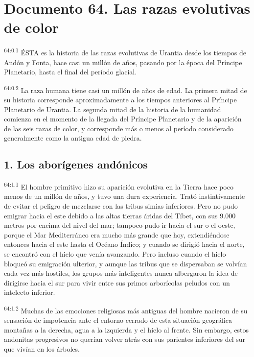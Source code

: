 \chapter{Documento 64. Las razas evolutivas de color}
\par
\textsuperscript{64:0.1} ÉSTA es la historia de las razas evolutivas de Urantia desde los tiempos de Andón y Fonta, hace casi un millón de años, pasando por la época del Príncipe Planetario, hasta el final del período glacial.

\par
\textsuperscript{64:0.2} La raza humana tiene casi un millón de años de edad. La primera mitad de su historia corresponde aproximadamente a los tiempos anteriores al Príncipe Planetario de Urantia. La segunda mitad de la historia de la humanidad comienza en el momento de la llegada del Príncipe Planetario y de la aparición de las seis razas de color, y corresponde más o menos al período considerado generalmente como la antigua edad de piedra.

\section*{1. Los aborígenes andónicos}
\par
\textsuperscript{64:1.1} El hombre primitivo hizo su aparición evolutiva en la Tierra hace poco menos de un millón de años, y tuvo una dura experiencia. Trató instintivamente de evitar el peligro de mezclarse con las tribus simias inferiores. Pero no pudo emigrar hacia el este debido a las altas tierras áridas del Tíbet, con sus 9.000 metros por encima del nivel del mar; tampoco pudo ir hacia el sur o el oeste, porque el Mar Mediterráneo era mucho más grande que hoy, extendiéndose entonces hacia el este hasta el Océano Índico; y cuando se dirigió hacia el norte, se encontró con el hielo que venía avanzando. Pero incluso cuando el hielo bloqueó su emigración ulterior, y aunque las tribus que se dispersaban se volvían cada vez más hostiles, los grupos más inteligentes nunca albergaron la idea de dirigirse hacia el sur para vivir entre sus primos arborícolas peludos con un intelecto inferior.

\par
\textsuperscript{64:1.2} Muchas de las emociones religiosas más antiguas del hombre nacieron de su sensación de impotencia ante el entorno cerrado de esta situación geográfica ---montañas a la derecha, agua a la izquierda y el hielo al frente. Sin embargo, estos andonitas progresivos no querían volver atrás con sus parientes inferiores del sur que vivían en los árboles.

